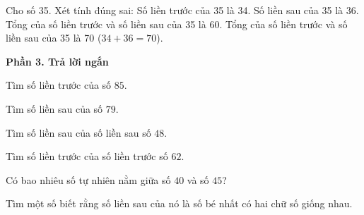 \begin{ex} %
Cho số 35. Xét tính đúng sai:
\choiceTF
{\True Số liền trước của 35 là 34.}
{\True Số liền sau của 35 là 36.}
{Tổng của số liền trước và số liền sau của 35 là 60.}
{\True Tổng của số liền trước và số liền sau của 35 là 70 ($34 + 36 = 70$).}
\end{ex}

\textbf{Phần 3. Trả lời ngắn}

\begin{ex} %
Tìm số liền trước của số $85$.
\end{ex}

\begin{ex} %
Tìm số liền sau của số $79$.
\end{ex}

\begin{ex} %
Tìm số liền sau của số liền sau số $48$.
\end{ex}

\begin{ex} %
Tìm số liền trước của số liền trước số $62$.
\end{ex}

\begin{ex} %
Có bao nhiêu số tự nhiên nằm giữa số $40$ và số $45$?
\end{ex}

\begin{ex} %
Tìm một số biết rằng số liền sau của nó là số bé nhất có hai chữ số giống nhau.
\end{ex}

